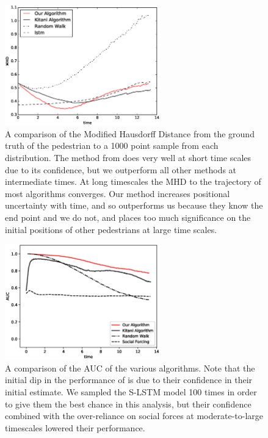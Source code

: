 \documentclass[usenames,dvipsnames]{article}
\begin{document}
\begin{enumerate}
\begin{item}
\end{item}
\begin{figure}
	\centering
	\includegraphics[width=0.6\textwidth]{figures/mhd_results.eps}
	\caption{A comparison of the Modified Hausdorff Distance from the ground truth of the pedestrian to a 1000 point sample from each distribution. The method from \cite{Alahi2016} does very well at short time scales due to its confidence, but we outperform all other methods at intermediate times. At long timescales the MHD to the trajectory of most algorithms converges. Our method increases positional uncertainty with time, and so \cite{Kitani2012} outperforms us because they know the end point and we do not, and \cite{Alahi2016} places too much significance on the initial positions of other pedestrians at large time scales.}
   \reversemarginpar{}
	\label{MHD}
\end{figure}

\begin{figure}
	\centering
	\includegraphics[width=0.6\textwidth]{figures/the_results.eps}
	\caption{A comparison of the AUC of the various algorithms. Note that the initial dip in the performance of \cite{Kitani2012} is due to their confidence in their initial estimate. We sampled the S-LSTM \cite{Alahi2016} model 100 times in order to give them the best chance in this analysis, but their confidence combined with the over-reliance on social forces at moderate-to-large timescales lowered their performance.}
	\reversemarginpar{}
	\label{AUC}
\end{figure}


\end{enumerate}
\end{document}

